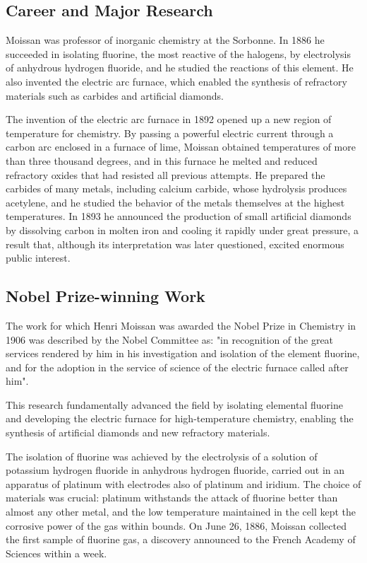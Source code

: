 \subsection*{Career and Major Research}

Moissan was professor of inorganic chemistry at the Sorbonne. In 1886 he succeeded in isolating fluorine, the most reactive of the halogens, by electrolysis of anhydrous hydrogen fluoride, and he studied the reactions of this element. He also invented the electric arc furnace, which enabled the synthesis of refractory materials such as carbides and artificial diamonds.

The invention of the electric arc furnace in 1892 opened up a new region of temperature for chemistry. By passing a powerful electric current through a carbon arc enclosed in a furnace of lime, Moissan obtained temperatures of more than three thousand degrees, and in this furnace he melted and reduced refractory oxides that had resisted all previous attempts. He prepared the carbides of many metals, including calcium carbide, whose hydrolysis produces acetylene, and he studied the behavior of the metals themselves at the highest temperatures. In 1893 he announced the production of small artificial diamonds by dissolving carbon in molten iron and cooling it rapidly under great pressure, a result that, although its interpretation was later questioned, excited enormous public interest.

\subsection*{Nobel Prize-winning Work}

The work for which Henri Moissan was awarded the Nobel Prize in Chemistry in 1906 was described by the Nobel Committee as: "in recognition of the great services rendered by him in his investigation and isolation of the element fluorine, and for the adoption in the service of science of the electric furnace called after him".

This research fundamentally advanced the field by isolating elemental fluorine and developing the electric furnace for high-temperature chemistry, enabling the synthesis of artificial diamonds and new refractory materials.

The isolation of fluorine was achieved by the electrolysis of a solution of potassium hydrogen fluoride in anhydrous hydrogen fluoride, carried out in an apparatus of platinum with electrodes also of platinum and iridium. The choice of materials was crucial: platinum withstands the attack of fluorine better than almost any other metal, and the low temperature maintained in the cell kept the corrosive power of the gas within bounds. On June 26, 1886, Moissan collected the first sample of fluorine gas, a discovery announced to the French Academy of Sciences within a week.

